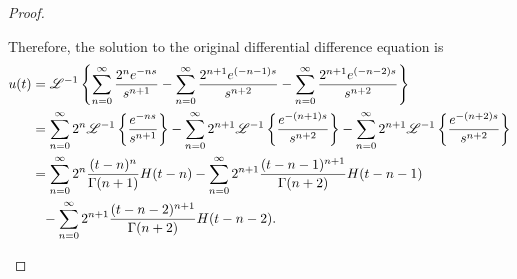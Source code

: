 \begin{proof}
\begin{enumerate}
      Therefore, the solution to the original differential difference equation is
      \begin{align*}
        u(t) &= \mathscr{L}^{-1}\left\{ {\sum_{n=0}^\infty \frac{2^ne^{-ns}}{s^{n+1}} - \sum_{n=0}^\infty \frac{2^{n+1}e^{(-n-1)s}}{s^{n+2}} - \sum_{n=0}^\infty \frac{2^{n+1}e^{(-n-2)s}}{s^{n+2}}} \right\} \\
        &= \sum_{n=0}^\infty 2^n\mathscr{L}^{-1}\left\{ {\frac{e^{-ns}}{s^{n+1}}} \right\} -
        \sum_{n=0}^\infty2^{n+1} \mathscr{L}^{-1}\left\{ {\frac{e^{-(n+1)s}}{s^{n+2}}} \right\} -
        \sum_{n=0}^\infty 2^{n+1}\mathscr{L}^{-1}\left\{ {\frac{e^{-(n+2)s}}{s^{n+2}}} \right\} \\
        &= \sum_{n=0}^\infty 2^n\frac{(t-n)^{n}}{\Gamma(n+1)}H(t-n)
        -\sum_{n=0}^\infty2^{n+1} \frac{(t-n-1)^{n+1}}{\Gamma(n+2)}H(t-n-1)\\
        &\phantom{=}-\sum_{n=0}^\infty 2^{n+1}\frac{(t-n-2)^{n+1}}{\Gamma(n+2)}H(t-n-2).
      \end{align*}
  \end{enumerate}
\end{proof}
\newpage
